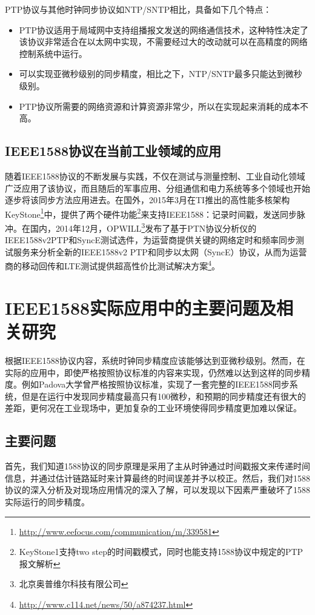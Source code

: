 PTP协议与其他时钟同步协议如NTP/SNTP相比，具备如下几个特点：
\begin{itemize}[noitemsep,topsep=0pt,parsep=0pt,partopsep=0pt]
	\item PTP协议适用于局域网中支持组播报文发送的网络通信技术，这种特性决定了该协议非常适合在以太网中实现，不需要经过大的改动就可以在高精度的网络控制系统中运行。
	\item 可以实现亚微秒级别的同步精度，相比之下，NTP/SNTP最多只能达到微秒级别。
	\item PTP协议所需要的网络资源和计算资源非常少，所以在实现起来消耗的成本不高。
\end{itemize}


\subsection{IEEE1588协议在当前工业领域的应用}
\label{sec:application}
随着IEEE1588协议的不断发展与实践，不仅在测试与测量控制、工业自动化领域广泛应用了该协议，而且随后的军事应用、分组通信和电力系统等多个领域也开始逐步将该同步方法应用进去。在国外，2015年3月在TI推出的高性能多核架构KeyStone\footnote{\url{http://www.eefocus.com/communication/m/339581}}中，提供了两个硬件功能\footnote{KeyStone1支持two step的时间戳模式，同时也能支持1588协议中规定的PTP报文解析}来支持IEEE1588：记录时间戳，发送同步脉冲。在国内，2014年12月，OPWILL\footnote{北京奥普维尔科技有限公司}发布了基于PTN协议分析仪的IEEE1588v2PTP和SyncE测试选件，为运营商提供关键的网络定时和频率同步测试服务来分析全新的IEEE1588v2 PTP和同步以太网（SyncE）协议，从而为运营商的移动回传和LTE测试提供超高性价比测试解决方案\footnote{\url{http://www.c114.net/news/50/a874237.html}}。

\section{IEEE1588实际应用中的主要问题及相关研究}
根据IEEE1588协议内容，系统时钟同步精度应该能够达到亚微秒级别\supercite{2}。然而，在实际的应用中，即使严格按照协议标准的内容来实现，仍然难以达到这样的同步精度。例如Padova大学曾严格按照协议标准，实现了一套完整的IEEE1588同步系统\supercite{3}，但是在运行中发现同步精度最高只有100微秒，和预期的同步精度还有很大的差距，更何况在工业现场中，更加复杂的工业环境使得同步精度更加难以保证。
\subsection{主要问题}
\label{sec:1588_problem}
首先，我们知道1588协议的同步原理是采用了主从时钟通过时间戳报文来传递时间信息，并通过估计链路延时来计算最终的时间误差并予以校正。然后，我们对1588协议的深入分析及对现场应用情况的深入了解，可以发现以下因素严重破坏了1588实际运行的同步精度。


